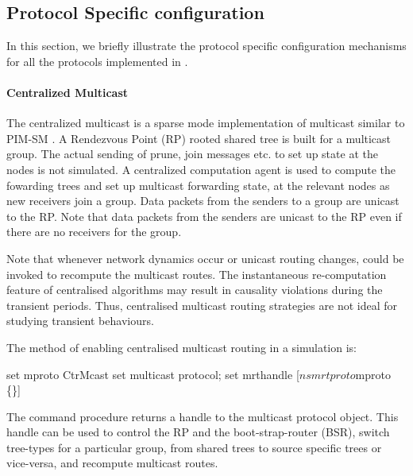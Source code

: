 {\subsection{Protocol Specific configuration}

In this section, we briefly illustrate the
protocol specific configuration mechanisms
for all the protocols implemented in \ns.

\paragraph{Centralized Multicast}
The centralized multicast is a sparse mode implementation of multicast
similar to PIM-SM \cite{Deer94a:Architecture}.
A Rendezvous Point (RP) rooted shared tree is built
for a multicast group.  The actual sending of prune, join messages
etc. to set up state at the nodes is not simulated.  A centralized
computation agent is used to compute the fowarding trees and set up
multicast forwarding state,  at the relevant nodes as new
receivers join a group.  Data packets from the senders to a group are
unicast to the RP.  Note that data packets from the senders are
unicast to the RP even if there are no receivers for the group.

Note that whenever network dynamics occur or unicast routing changes,
 could be invoked to recompute the multicast routes.
The instantaneous re-computation feature of centralised algorithms
may result in causality violations during the transient
periods.  Thus, centralised multicast routing strategies are not
ideal for studying transient behaviours.

The method of enabling centralised multicast routing in a simulation is:
\begin{program}
	set mproto CtrMcast    \; set multicast protocol;
	set mrthandle [$ns mrtproto $mproto \{\}]
\end{program}
The command procedure 
returns a handle to the multicast protocol object.
This handle can be used to control the RP and the boot-strap-router (BSR),
switch tree-types for a particular group,
from shared trees to source specific trees or vice-versa, and
recompute multicast routes.
}

